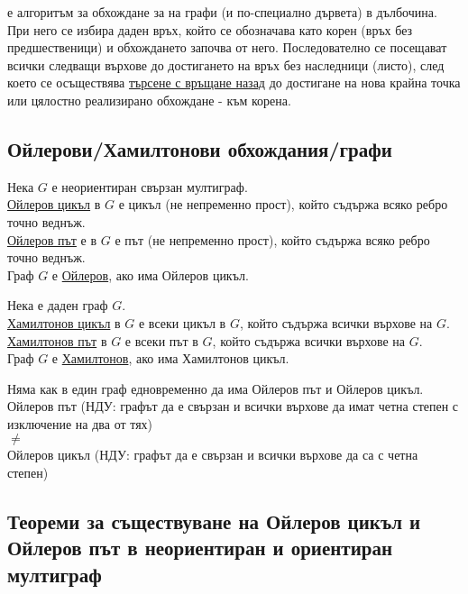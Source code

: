  е алгоритъм за обхождане за на графи (и по-специално дървета) в дълбочина. 
При него се избира даден връх, който се обозначава като корен (връх без предшественици) и обхождането 
започва от него. Последователно се посещават всички следващи върхове до достигането на връх без 
наследници (листо), след което се осъществява \underline{търсене с връщане назад} до достигане на нова 
крайна точка или цялостно реализирано обхождане - към корена.

\subsection*{Ойлерови/Хамилтонови обхождания/графи}

\begin{definition}
    Нека \(G\) е неориентиран свързан мултиграф. \\
    \underline{Ойлеров цикъл} в \(G\) е цикъл (не непременно прост), който съдържа всяко ребро точно веднъж. \\
    \underline{Ойлеров път} е в \(G\) е път (не непременно прост), който съдържа всяко ребро точно веднъж. \\
    Граф \(G\) е \underline{Ойлеров}, ако има Ойлеров цикъл.
\end{definition}

\begin{definition}
    Нека е даден граф \(G\). \\
    \underline{Хамилтонов цикъл} в \(G\) е всеки цикъл в \(G\), който съдържа всички върхове на \(G\). \\
    \underline{Хамилтонов път} в \(G\) е всеки път в \(G\), който съдържа всички върхове на \(G\). \\
    Граф \(G\) е \underline{Хамилтонов}, ако има Хамилтонов цикъл.
\end{definition}

\begin{note}
    Няма как в един граф едновременно да има Ойлеров път и Ойлеров цикъл. \\
    Ойлеров път (НДУ: графът да е свързан и всички върхове да имат четна степен с изключение на два от тях) 
    \\ \(\not = \) \\
    Ойлеров цикъл (НДУ: графът да е свързан и всички върхове да са с четна степен)
\end{note}

\subsection*{Теореми за съществуване на Ойлеров цикъл и Ойлеров път в неориентиран и ориентиран мултиграф}

